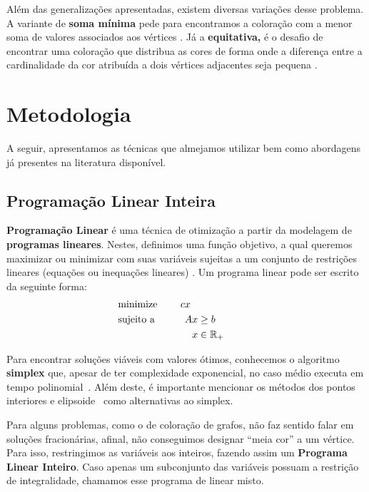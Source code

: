 \documentclass[11pt]{article}
\begin{document}
Além das generalizações apresentadas, existem diversas variações desse problema.
A variante de \textbf{soma mínima} pede para encontramos a coloração com a menor soma de valores associados aos vértices \autocite{Jin2016Algorithmsminimumsum}.
Já a \textbf{equitativa,} é o desafio de encontrar uma coloração que distribua as cores de forma onde a diferença entre a cardinalidade da cor atribuída a dois vértices adjacentes seja pequena \autocite{Meyer1973EquitableColoring}.

\section{Metodologia}
\label{sec:org131eeaa}
\label{metodologia}
A seguir, apresentamos as técnicas que almejamos utilizar bem como abordagens já presentes na literatura disponível.

\subsection{Programação Linear Inteira}
\label{sec:org8e2fcf8}
\textbf{Programação Linear} é uma técnica de otimização a partir da modelagem de \textbf{programas lineares}.
Nestes, definimos uma função objetivo, a qual queremos maximizar ou minimizar com suas variáveis sujeitas a um conjunto de restrições lineares (equações ou inequações lineares) \autocite{Chvatal1983LinearProgramming}. Um programa linear pode ser escrito da seguinte forma:
\begin{alignat*}{4}
& \omit\rlap{minimize \quad \quad $\displaystyle cx$} \\
& \mbox{sujeito a}&& \quad & Ax & \geq b  & \quad &  \\
&                 &&       & x               & \in \mathbb{R}_+ &      &
\end{alignat*}

Para encontrar soluções viáveis com valores ótimos, conhecemos o algoritmo \textbf{simplex} que, apesar de ter complexidade exponencial, no caso médio executa em tempo polinomial~\autocite{Borgwardt1986SimplexMethodAlgorithms}.
Além deste, é importante mencionar os métodos dos pontos interiores \autocite{Karmarkar1984newpolynomialtime} e elipsoide~\autocite{Bland1981FeatureArticleTheEllipsoid} como alternativas ao simplex.

Para alguns problemas, como o de coloração de grafos, não faz sentido falar em soluções fracionárias, afinal, não conseguimos designar ``meia cor'' a um vértice.
Para isso, restringimos as variáveis aos inteiros, fazendo assim um \textbf{Programa Linear Inteiro}. Caso apenas um subconjunto das variáveis possuam a restrição de integralidade, chamamos esse programa de linear misto.
\end{document}
